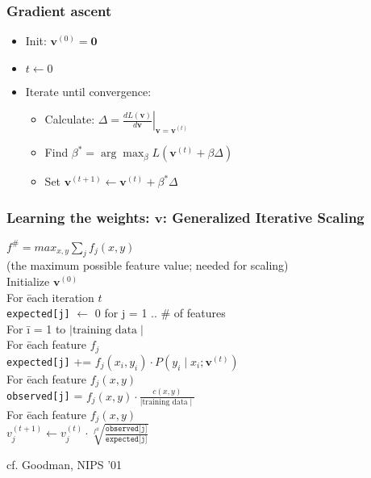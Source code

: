 \begin{frame}
\frametitle{Gradient ascent}
\begin{itemize}[<+->]
\item Init: $\textbf{v}^{(0)} = \textbf{0}$
\item $t \leftarrow 0$
\item Iterate until convergence:
\begin{itemize}[<+->]
\item Calculate: $\Delta = \left. \frac{d L(\textbf{v})}{d \textbf{v}}  \right|_{\textbf{v} = \textbf{v}^{(t)}}$
\item Find $\beta^\ast = \arg\max_\beta L(\textbf{v}^{(t)} + \beta \Delta)$
\item Set $\textbf{v}^{(t+1)} \leftarrow \textbf{v}^{(t)} + \beta^\ast \Delta$
\end{itemize}
\end{itemize}
\end{frame}

\begin{frame}
\frametitle{Learning the weights: $\textbf{v}$: Generalized Iterative
  Scaling}
\begin{tabbing}
$f^\# = max_{x,y} \sum_{j} f_j(x, y)$ \\
(the maximum possible feature value; needed for scaling) \pause \\
Initialize $\textbf{v}^{(0)}$ \pause \\
For \= each iteration $t$ \\
\> \texttt{expected[j]} $\leftarrow$ 0 for j = 1 .. \# of features \pause \\
\> For \= i = 1 to $\mid \textrm{training data} \mid$ \\
\>     \> For \= each feature $f_j$ \\
\>     \>     \> \texttt{expected[j]} += $f_j(x_i, y_i) \cdot P(y_i \mid x_i; \textbf{v}^{(t)})$ \pause \\
\> For \= each feature $f_j(x,y)$ \\
\>     \> \texttt{observed[j]} = $f_j(x, y) \cdot \frac{c(x,y)}{\mid \textrm{training data} \mid}$ \pause \\ 
\> For \= each feature $f_j(x,y)$ \\
\>     \> $v_j^{(t+1)} \leftarrow v_j^{(t)} \cdot \sqrt[f^\#]{\frac{\texttt{observed[j]}}{\texttt{expected[j]}}}$ 
\end{tabbing}
\par\noindent
\small{cf. Goodman, NIPS '01}
\end{frame} 

